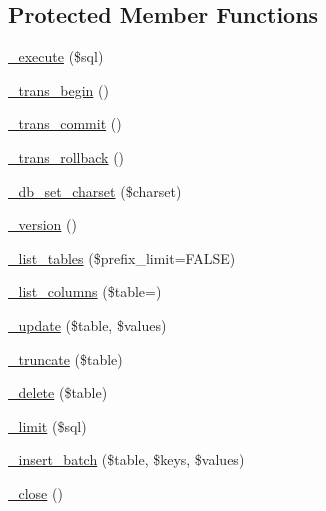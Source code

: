 \subsection*{Protected Member Functions}
\begin{DoxyCompactItemize}
\item 
\mbox{\hyperlink{class_c_i___d_b__mssql__driver_a114ab675d89bf8324a41785fb475e86d}{\+\_\+execute}} (\$sql)
\item 
\mbox{\hyperlink{class_c_i___d_b__mssql__driver_ac81ac882c1d54347d810199a15856aac}{\+\_\+trans\+\_\+begin}} ()
\item 
\mbox{\hyperlink{class_c_i___d_b__mssql__driver_a6fe7f373e0b11cfae23a5f41c0b35dda}{\+\_\+trans\+\_\+commit}} ()
\item 
\mbox{\hyperlink{class_c_i___d_b__mssql__driver_ad49a116b0776c26b53114c9093fd102a}{\+\_\+trans\+\_\+rollback}} ()
\item 
\mbox{\hyperlink{class_c_i___d_b__mssql__driver_a2b808d420d8e9fea0b73ad7127f5efb8}{\+\_\+db\+\_\+set\+\_\+charset}} (\$charset)
\item 
\mbox{\hyperlink{class_c_i___d_b__mssql__driver_ac997a462bb342f97f414910f0e033fb6}{\+\_\+version}} ()
\item 
\mbox{\hyperlink{class_c_i___d_b__mssql__driver_a435c0f3ce54fe7daa178baa8532ebd54}{\+\_\+list\+\_\+tables}} (\$prefix\+\_\+limit=F\+A\+L\+SE)
\item 
\mbox{\hyperlink{class_c_i___d_b__mssql__driver_a7ccb7f9c301fe7f0a9db701254142b63}{\+\_\+list\+\_\+columns}} (\$table=\textquotesingle{}\textquotesingle{})
\item 
\mbox{\hyperlink{class_c_i___d_b__mssql__driver_a2540b03a93fa73ae74c10d0e16fc073e}{\+\_\+update}} (\$table, \$values)
\item 
\mbox{\hyperlink{class_c_i___d_b__mssql__driver_aa029600528fc1ce660a23ff4b4667f95}{\+\_\+truncate}} (\$table)
\item 
\mbox{\hyperlink{class_c_i___d_b__mssql__driver_a133ea8446ded52589bd22cc9163d0896}{\+\_\+delete}} (\$table)
\item 
\mbox{\hyperlink{class_c_i___d_b__mssql__driver_a3a02ea06541b8ecc25a33a61651562c8}{\+\_\+limit}} (\$sql)
\item 
\mbox{\hyperlink{class_c_i___d_b__mssql__driver_a1978e1358c812587a46e242630365099}{\+\_\+insert\+\_\+batch}} (\$table, \$keys, \$values)
\item 
\mbox{\hyperlink{class_c_i___d_b__mssql__driver_a4d9082658000e5ede8312067c6dda9db}{\+\_\+close}} ()
\end{DoxyCompactItemize}
